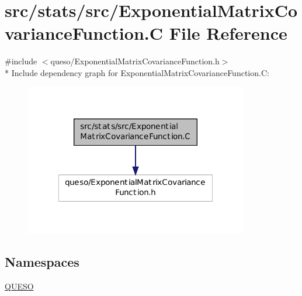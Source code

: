 \hypertarget{_exponential_matrix_covariance_function_8_c}{\section{src/stats/src/\-Exponential\-Matrix\-Covariance\-Function.C File Reference}
\label{_exponential_matrix_covariance_function_8_c}
}
{\ttfamily \#include $<$queso/\-Exponential\-Matrix\-Covariance\-Function.\-h$>$}\\*
Include dependency graph for Exponential\-Matrix\-Covariance\-Function.\-C\-:
\nopagebreak
\begin{figure}[H]
\begin{center}
\leavevmode
\includegraphics[width=276pt]{_exponential_matrix_covariance_function_8_c__incl}
\end{center}
\end{figure}
\subsection*{Namespaces}
\begin{DoxyCompactItemize}
\item 
\hyperlink{namespace_q_u_e_s_o}{Q\-U\-E\-S\-O}
\end{DoxyCompactItemize}
